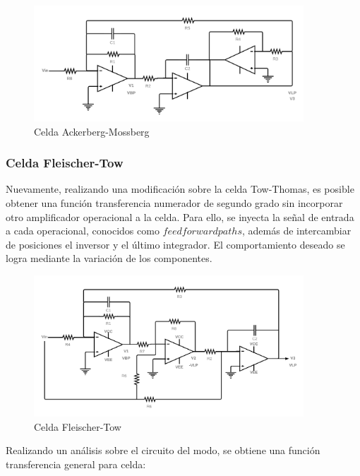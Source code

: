 \begin{figure}[H]
    \centering
    \includegraphics[width= 0.9\textwidth]{../Ejercicio2-DisenoDeCeldas/4CeldaUniversal/Informe/celdaAM.png}
    \caption{Celda Ackerberg-Mossberg}
    \label{fig:celdaAM}
\end{figure}


\subsubsection{Celda Fleischer-Tow}


Nuevamente, realizando una modificación sobre la celda Tow-Thomas, es posible obtener una función transferencia numerador de segundo grado sin incorporar otro amplificador operacional a la celda. Para ello, se inyecta la señal de entrada a cada operacional, conocidos como $feedforward paths$, además de intercambiar de posiciones el inversor y el último integrador. El comportamiento deseado se logra mediante la variación de los componentes.  

\begin{figure}[H]
    \centering
    \includegraphics[width= 0.9\textwidth]{../Ejercicio2-DisenoDeCeldas/4CeldaUniversal/Informe/FleischerTow.png}
    \caption{Celda Fleischer-Tow}
    \label{fig:FleischerTow}
\end{figure}

Realizando un análisis sobre el circuito del modo, se obtiene una función transferencia general para celda:


